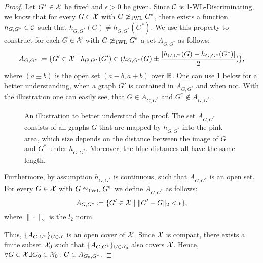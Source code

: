 \begin{proof}
    Let $G^* \in \mathcal{X}$ be fixed and $\epsilon > 0$ be given. Since $\mathcal{C}$ is 1-\!WL-Discriminating, we know that for every $G \in \mathcal{X}$ with $G \not\simeq_{\text{1WL}} G^*$, there exists a function $h_{G, G^*} \in \mathcal{C}$ such that $h_{G, G^*}(G) \neq h_{G, G^*}(G^*)$. We use this property to construct for each $G \in \mathcal{X}$ with $G \not\simeq_{\text{1WL}} G^*$ a set $A_{G, G^*}$ as follows:
    \begin{equation*}
        A_{G, G^*} \coloneqq \{ G' \in \mathcal{X} \mid h_{G, G^*}(G') \in (h_{G, G^*}(G) \pm \frac{|h_{G, G^*}(G) - h_{G, G^*}(G^*)|}{2})\},
    \end{equation*}
    where $(a \pm b)$ is the open set $(a-b, a+b)$ over $\mathbb{R}$.
    One can use \cref{fig:continuous_proof1} below for a better understanding, when a graph $G'$ is contained in $A_{G, G^*}$ and when not. With the illustration one can easily see, that $G \in A_{G, G^*}$ and $G^* \not\in A_{G, G^*}$.

    \begin{figure}[H]
        \centering
        
        \caption{An illustration to better understand the proof. The set $A_{G, G^*}$ consists of all graphs $G$ that are mapped by $h_{G, G^*}$ into the pink area, which size depends on the distance between the image of $G$ and $G^*$ under $h_{G, G^*}$. Moreover, the blue distances all have the same length.}
        \label{fig:continuous_proof1}
    \end{figure}

   Furthermore, by assumption $h_{G, G^*}$ is continuous, such that $A_{G, G^*}$ is an open set. For every $G \in \mathcal{X}$ with $G \simeq_{\text{1WL}} G^*$ we define $A_{G, G^*}$ as follows:
    \begin{equation*}
        A_{G, G^*} \coloneqq \{ G' \in \mathcal{X} \mid \| G' - G \|_2 < \epsilon\},
    \end{equation*}
    where $\|\cdot\|_2$ is the $l_2$ norm.

    Thus, $\{ A_{G, G^*} \}_{G \in \mathcal{X}}$ is an open cover of $\mathcal{X}$. Since $\mathcal{X}$ is compact, there exists a finite subset $\mathcal{X}_0$ such that $\{ A_{G, G^*} \}_{G \in \mathcal{X}_0}$ also covers $\mathcal{X}$. Hence, $\forall G \in \mathcal{X} \exists G_0 \in \mathcal{X}_0: G \in A_{G_0, G^*}$.



\end{proof}
